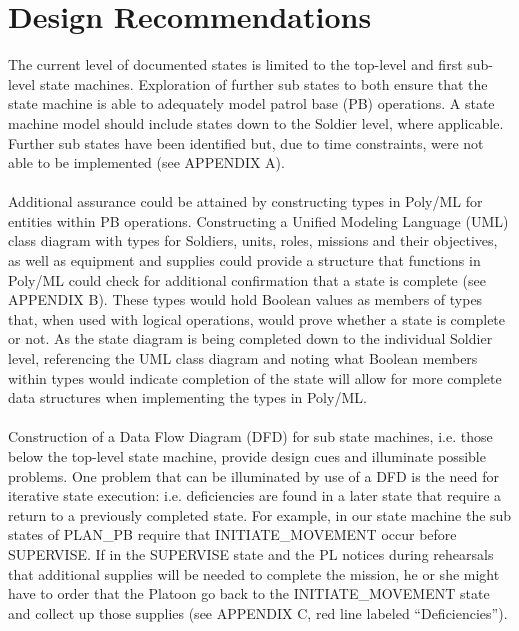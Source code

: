 
\section{Design Recommendations}
\label{sec:design-recomm}

The current level of documented states is limited to the top-level and
first sub-level state machines. Exploration of further sub states to
both ensure that the state machine is able to adequately model patrol
base (PB) operations. A state machine model should include states down
to the Soldier level, where applicable. Further sub states have been
identified but, due to time constraints, were not able to be implemented
(see APPENDIX A).\\\\
Additional assurance could be attained by constructing types in Poly/ML
for entities within PB operations. Constructing a Unified Modeling Language
(UML) class diagram with types for Soldiers, units, roles, missions and
their objectives, as well as equipment and supplies could provide a structure
that functions in Poly/ML could check for additional confirmation that a
state is complete (see APPENDIX B). These types would hold Boolean values
as members of types that, when used with logical operations, would prove
whether a state is complete or not. As the state diagram is being completed
down to the individual Soldier level, referencing the UML class diagram and
noting what Boolean members within types would indicate completion of the
state will allow for more complete data structures when implementing the
types in Poly/ML.\\\\
Construction of a Data Flow Diagram (DFD) for sub state machines, i.e.
those below the top-level state machine, provide design cues and illuminate
possible problems. One problem that can be illuminated by use of a DFD is
the need for iterative state execution: i.e. deficiencies are found in a
later state that require a return to a previously completed state. For
example, in our state machine the sub states of PLAN_PB require that
INITIATE_MOVEMENT occur before SUPERVISE. If in the SUPERVISE state and
the PL notices during rehearsals that additional supplies will be needed
to complete the mission, he or she might have to order that the Platoon go
back to the INITIATE_MOVEMENT state and collect up those supplies (see
APPENDIX C, red line labeled “Deficiencies”).\\\\

